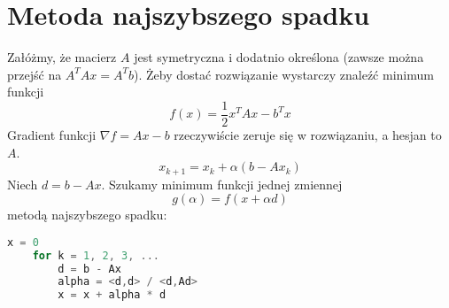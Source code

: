 \section{Metoda najszybszego spadku}
Załóżmy, że macierz \( A \) jest symetryczna i dodatnio określona (zawsze można przejść na \( A^TAx = A^Tb \)). Żeby dostać rozwiązanie wystarczy znaleźć minimum funkcji
\[
	f(x) = \frac{1}{2}x^TAx - b^Tx
\]
Gradient funkcji \( \nabla f = Ax - b \) rzeczywiście zeruje się w rozwiązaniu, a hesjan to \( A \).
\[
	x_{k+1} = x_k + \alpha(b - Ax_k)
\]
Niech \( d = b - Ax \). Szukamy minimum funkcji jednej zmiennej
\[
	g(\alpha) = f(x + \alpha d)
\]
metodą najszybszego spadku:
\begin{lstlisting}[language=Cpp]
    x = 0
    for k = 1, 2, 3, ...
        d = b - Ax
        alpha = <d,d> / <d,Ad>
        x = x + alpha * d
\end{lstlisting}